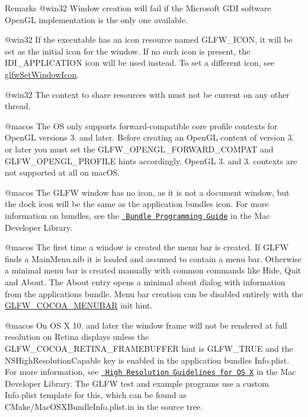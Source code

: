 \begin{DoxyRemark}{Remarks}
@win32 Window creation will fail if the Microsoft G\+DI software Open\+GL implementation is the only one available.

@win32 If the executable has an icon resource named {\ttfamily G\+L\+F\+W\+\_\+\+I\+C\+ON,} it will be set as the initial icon for the window. If no such icon is present, the {\ttfamily I\+D\+I\+\_\+\+A\+P\+P\+L\+I\+C\+A\+T\+I\+ON} icon will be used instead. To set a different icon, see \mbox{\hyperlink{group__window_ga182987a1a62a41a924842b9473d560df}{glfw\+Set\+Window\+Icon}}.

@win32 The context to share resources with must not be current on any other thread.

@macos The OS only supports forward-\/compatible core profile contexts for Open\+GL versions 3. and later. Before creating an Open\+GL context of version 3. or later you must set the G\+L\+F\+W\+\_\+\+O\+P\+E\+N\+G\+L\+\_\+\+F\+O\+R\+W\+A\+R\+D\+\_\+\+C\+O\+M\+P\+AT and G\+L\+F\+W\+\_\+\+O\+P\+E\+N\+G\+L\+\_\+\+P\+R\+O\+F\+I\+LE hints accordingly. Open\+GL 3. and 3. contexts are not supported at all on mac\+OS.

@macos The G\+L\+FW window has no icon, as it is not a document window, but the dock icon will be the same as the application bundle\textquotesingle{}s icon. For more information on bundles, see the \href{https://developer.apple.com/library/mac/documentation/CoreFoundation/Conceptual/CFBundles/}{\texttt{ Bundle Programming Guide}} in the Mac Developer Library.

@macos The first time a window is created the menu bar is created. If G\+L\+FW finds a {\ttfamily Main\+Menu.\+nib} it is loaded and assumed to contain a menu bar. Otherwise a minimal menu bar is created manually with common commands like Hide, Quit and About. The About entry opens a minimal about dialog with information from the application\textquotesingle{}s bundle. Menu bar creation can be disabled entirely with the \mbox{\hyperlink{group__init_ga71e0b4ce2f2696a84a9b8c5e12dc70cf}{G\+L\+F\+W\+\_\+\+C\+O\+C\+O\+A\+\_\+\+M\+E\+N\+U\+B\+AR}} init hint.

@macos On OS X 10. and later the window frame will not be rendered at full resolution on Retina displays unless the G\+L\+F\+W\+\_\+\+C\+O\+C\+O\+A\+\_\+\+R\+E\+T\+I\+N\+A\+\_\+\+F\+R\+A\+M\+E\+B\+U\+F\+F\+ER hint is {\ttfamily G\+L\+F\+W\+\_\+\+T\+R\+UE} and the {\ttfamily N\+S\+High\+Resolution\+Capable} key is enabled in the application bundle\textquotesingle{}s {\ttfamily Info.\+plist}. For more information, see \href{https://developer.apple.com/library/mac/documentation/GraphicsAnimation/Conceptual/HighResolutionOSX/Explained/Explained.html}{\texttt{ High Resolution Guidelines for OS X}} in the Mac Developer Library. The G\+L\+FW test and example programs use a custom {\ttfamily Info.\+plist} template for this, which can be found as {\ttfamily C\+Make/\+Mac\+O\+S\+X\+Bundle\+Info.\+plist.\+in} in the source tree.


\end{DoxyRemark}
